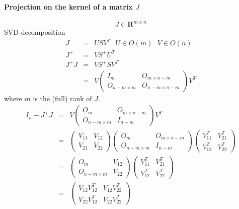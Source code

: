 \documentclass {article}
\newcommand\reals{\mathbf{R}}
\begin{document}
\paragraph {Projection on the kernel of a matrix $J$}
$$
J\in \reals^{m\times n}
$$
SVD decomposition
\begin{eqnarray*}
J &=& U S V^T \ \ \ U\in O(m)\ \ \ V\in O(n)\\
J^{+} &=& V S^{+} U^T \\
J^{+} J &=& V S^{+} S V^T \\
&=& V \left(\begin{array} {cc}
I_m & O_{m\times n-m} \\
O_{n-m\times m} & O_{n-m\times n-m}
\end{array}\right) V^T
\end{eqnarray*}
where $m$ is the (full) rank of $J$.
\begin{eqnarray*}
I_{n} - J^{+} J &=& V \left(\begin{array} {cc}
O_m & O_{m\times n-m} \\
O_{n-m\times m} & I_{n-m}
\end{array}\right) V^T \\
&=& \left(\begin{array}{cc}
V_{11} & V_{12} \\
V_{21} & V_{22} \end{array}\right)
\left(\begin{array} {cc}
O_m & O_{m\times n-m} \\
O_{n-m\times m} & I_{n-m}
\end{array}\right)
\left(\begin{array}{cc}
V^T_{11} & V^T_{21} \\
V^T_{12} & V^T_{22} \end{array}\right)\\
&=&
\left(\begin{array} {cc}
O_m & V_{12} \\
O_{n-m\times m} & V_{22}
\end{array}\right)
\left(\begin{array}{cc}
V^T_{11} & V^T_{21} \\
V^T_{12} & V^T_{22} \end{array}\right)\\
&=&
\left(\begin{array}{cc}
V_{12}V^T_{12} & V_{12}V^T_{22} \\
V_{22}V^T_{12} & V_{22}V^T_{22} \end{array}\right)
\end{eqnarray*}
\end{document}

